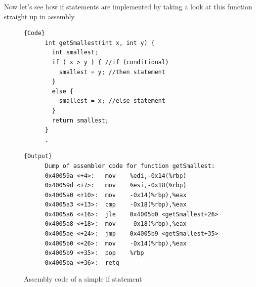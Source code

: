   Now let's see how if statements are implemented by taking a look at this function straight up in assembly. 

  \begin{figure}[H]
    \centering 
    \noindent\begin{minipage}{.4\textwidth}
    \begin{lstlisting}[]{Code}
      int getSmallest(int x, int y) {
        int smallest;
        if ( x > y ) { //if (conditional)
          smallest = y; //then statement
        }
        else {
          smallest = x; //else statement
        }
        return smallest;
      }
      .
    \end{lstlisting}
    \end{minipage}
    \hfill
    \begin{minipage}{.59\textwidth}
    \begin{lstlisting}[]{Output}
      Dump of assembler code for function getSmallest:
      0x40059a <+4>:   mov    %edi,-0x14(%rbp)
      0x40059d <+7>:   mov    %esi,-0x18(%rbp)
      0x4005a0 <+10>:  mov    -0x14(%rbp),%eax
      0x4005a3 <+13>:  cmp    -0x18(%rbp),%eax
      0x4005a6 <+16>:  jle    0x4005b0 <getSmallest+26>
      0x4005a8 <+18>:  mov    -0x18(%rbp),%eax
      0x4005ae <+24>:  jmp    0x4005b9 <getSmallest+35>
      0x4005b0 <+26>:  mov    -0x14(%rbp),%eax
      0x4005b9 <+35>:  pop    %rbp
      0x4005ba <+36>:  retq
    \end{lstlisting}
    \end{minipage}
    \caption{Assembly code of a simple if statement} 
    \label{fig:if_statement}
  \end{figure}

